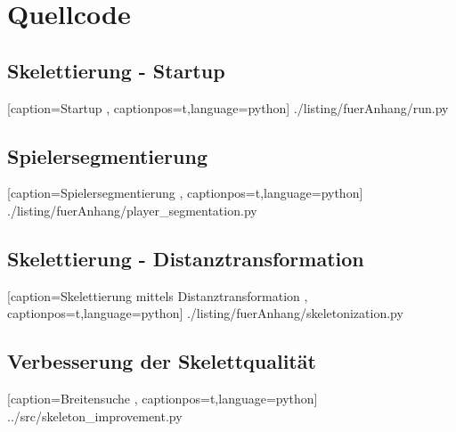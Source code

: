 \chapter{Quellcode}
\label{anhang:quellcode}
\section{Skelettierung - Startup}
 
    [caption={Startup}
       \label{lst:startup},
       captionpos=t,language=python]
 {./listing/fuerAnhang/run.py}
 \newpage
\section{Spielersegmentierung}

    [caption={Spielersegmentierung}
       \label{lst:anhang_spielersegmentierung},
       captionpos=t,language=python]
 {./listing/fuerAnhang/player_segmentation.py}
 \newpage
\section{Skelettierung - Distanztransformation}

    [caption={Skelettierung mittels Distanztransformation}
       \label{lst:anhang_distanztransformation},
       captionpos=t,language=python]
 {./listing/fuerAnhang/skeletonization.py}
\section{Verbesserung der Skelettqualität}
 
    [caption={Breitensuche}
       \label{lst:breitensuche},
       captionpos=t,language=python]
 {../src/skeleton_improvement.py}